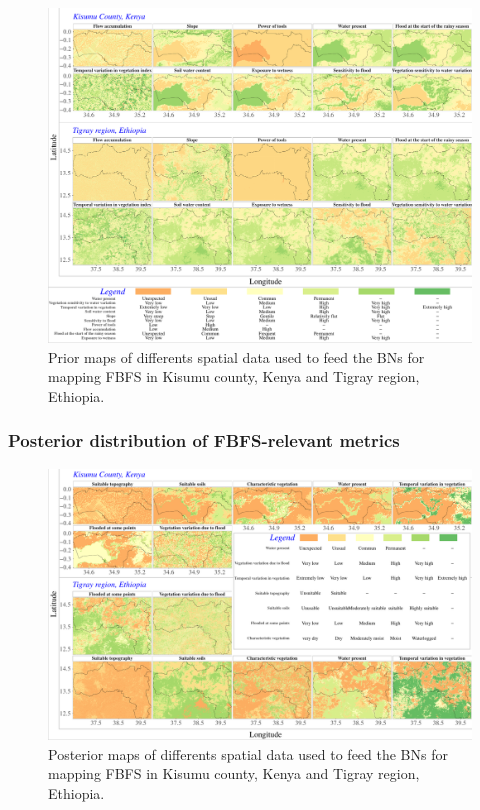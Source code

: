 \documentclass[]{elsarticle} %
\begin{document}
\begin{figure}[!h]

{\centering \includegraphics[width=1\linewidth,]{figures/prior_plot} 

}

\caption{Prior maps of differents spatial data used to feed the BNs for mapping FBFS in Kisumu county, Kenya and Tigray region, Ethiopia.}\label{fig:fig6}
\end{figure}

\hypertarget{section_3_2_2}{%
\subsubsection{Posterior distribution of FBFS-relevant metrics}\label{section_3_2_2}}

\begin{figure}[!h]

{\centering \includegraphics[width=1\linewidth,]{figures/posterior_plot} 

}

\caption{Posterior maps of differents spatial data used to feed the BNs for mapping FBFS in Kisumu county, Kenya and Tigray region, Ethiopia.}\label{fig:fig7}
\end{figure}
\end{document}
